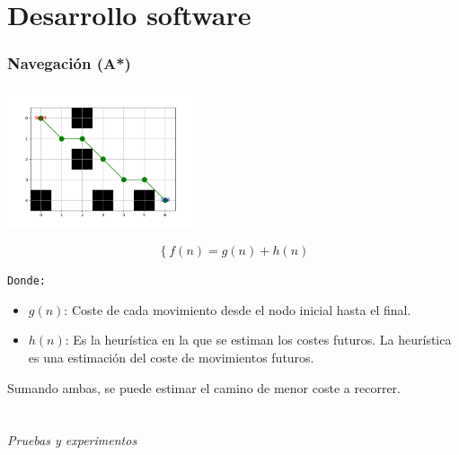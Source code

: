 \documentclass{beamer}
\begin{document}
\section{Desarrollo software}
\begin{frame}
\frametitle{Navegación (A*)}
\centering


\begin{minipage}{0.45\textwidth}
    \centering
    \includegraphics[width=5.5cm]{figs/astar4.png}
\end{minipage}

\vspace{-0.6cm} %
\begin{equation}
\left\{
	f(n) = g(n) + h(n)
\right.
\label{ec:ec678}
\end{equation}

\texttt{Donde:}
\begin{itemize}
    \item $g(n)$: Coste de cada movimiento desde el nodo inicial hasta el final.
    \item $h(n)$: Es la heurística en la que se estiman los costes futuros. La heurística es una estimación del coste de movimientos futuros.
\end{itemize}

Sumando ambas, se puede estimar el camino de menor coste a recorrer.
\end{frame}

\section*{}
\begin{frame}{}
  \centering \Huge
  \emph{Pruebas y experimentos}
\end{frame}
\end{document}
